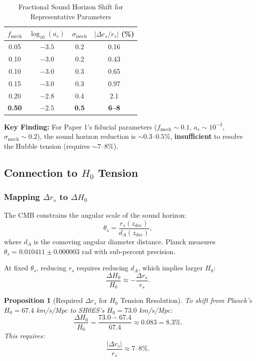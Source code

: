 \documentclass[11pt,a4paper]{article}
\newcommand{\fmech}{\ensuremath{f_{\mathrm{mech}}}}
\newcommand{\ac}{\ensuremath{a_c}}
\newcommand{\sigmamech}{\ensuremath{\sigma_{\mathrm{mech}}}}
\newcommand{\zdec}{\ensuremath{z_{\mathrm{dec}}}}
\newcommand{\rs}{\ensuremath{r_s}}
\newcommand{\dA}{\ensuremath{d_A}}
\newtheorem{proposition}[theorem]{Proposition}
\theoremstyle{definition}
\theoremstyle{remark}
\begin{document}
\begin{table}[H]
\centering
\caption{Fractional Sound Horizon Shift for Representative Parameters}
\label{tab:Deltars_values}
\begin{tabular}{@{}cccc@{}}
\toprule
$\fmech$ & $\log_{10}(\ac)$ & $\sigmamech$ & $|\Delta\rs/\rs|$ (\%) \\
\midrule
0.05 & $-3.5$ & 0.2 & 0.16 \\
0.10 & $-3.0$ & 0.2 & 0.43 \\
0.10 & $-3.0$ & 0.3 & 0.65 \\
0.15 & $-3.0$ & 0.3 & 0.97 \\
0.20 & $-2.8$ & 0.4 & 2.1 \\
\textbf{0.50} & $\mathbf{-2.5}$ & \textbf{0.5} & \textbf{6--8} \\
\bottomrule
\end{tabular}
\end{table}

\textbf{Key Finding:} For Paper 1's fiducial parameters ($\fmech \sim 0.1$, $\ac \sim 10^{-3}$, $\sigmamech \sim 0.2$), the sound horizon reduction is $\sim 0.3$--$0.5\%$, \textbf{insufficient} to resolve the Hubble tension (requires $\sim 7$--$8\%$).

\subsection{Connection to $H_0$ Tension}
\label{sec:H0_connection}

\subsubsection{Mapping $\Delta\rs$ to $\Delta H_0$}

The CMB constrains the angular scale of the sound horizon:
\begin{equation}
\theta_s = \frac{\rs(\zdec)}{\dA(\zdec)},
\end{equation}
where $\dA$ is the comoving angular diameter distance. Planck measures $\theta_s = 0.010411 \pm 0.000003$ rad with sub-percent precision.

At fixed $\theta_s$, reducing $\rs$ requires reducing $\dA$, which implies larger $H_0$:
\begin{equation}
\frac{\Delta H_0}{H_0} \approx -\frac{\Delta\rs}{\rs}.
\end{equation}

\begin{proposition}[Required $\Delta\rs$ for $H_0$ Tension Resolution]
\label{prop:H0_requirement}
To shift from Planck's $H_0 = 67.4$ km/s/Mpc to SH0ES's $H_0 = 73.0$ km/s/Mpc:
\begin{equation}
\frac{\Delta H_0}{H_0} = \frac{73.0 - 67.4}{67.4} \approx 0.083 = 8.3\%.
\end{equation}
This requires:
\begin{equation}
\boxed{\frac{|\Delta\rs|}{\rs} \approx 7\text{--}8\%.}
\end{equation}
\end{proposition}
\end{document}
